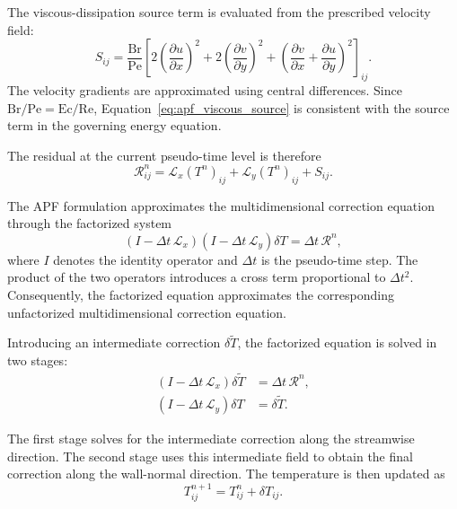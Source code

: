 The viscous-dissipation source term is evaluated from the
prescribed velocity field:
\begin{equation}
\boxed{
S_{ij}
=
\frac{\mathrm{Br}}{\mathrm{Pe}}
\left[
2\left(\frac{\partial u}{\partial x}\right)^2
+
2\left(\frac{\partial v}{\partial y}\right)^2
+
\left(
\frac{\partial v}{\partial x}
+
\frac{\partial u}{\partial y}
\right)^2
\right]_{ij}.
}
\label{eq:apf_viscous_source}
\end{equation}
The velocity gradients are approximated using central differences.
Since $\mathrm{Br}/\mathrm{Pe}=\mathrm{Ec}/\mathrm{Re}$,
Equation~\eqref{eq:apf_viscous_source} is consistent with the
source term in the governing energy equation.

The residual at the current pseudo-time level is therefore
\begin{equation}
\boxed{
\mathcal{R}_{ij}^{n}
=
\mathcal{L}_x(T^n)_{ij}
+
\mathcal{L}_y(T^n)_{ij}
+
S_{ij}.
}
\label{eq:apf_current_residual}
\end{equation}

The APF formulation approximates the multidimensional
correction equation through the factorized system
\begin{equation}
\boxed{
\left(I-\Delta t\,\mathcal{L}_x\right)
\left(I-\Delta t\,\mathcal{L}_y\right)
\delta T
=
\Delta t\,\mathcal{R}^{n},
}
\label{eq:apf_factorized_equation}
\end{equation}
where $I$ denotes the identity operator and $\Delta t$ is
the pseudo-time step. The product of the two operators
introduces a cross term proportional to $\Delta t^2$.
Consequently, the factorized equation approximates the
corresponding unfactorized multidimensional correction equation.

Introducing an intermediate correction
$\delta\widetilde{T}$, the factorized equation is solved in
two stages:
\begin{align}
\left(I-\Delta t\,\mathcal{L}_x\right)
\delta\widetilde{T}
&=
\Delta t\,\mathcal{R}^{n},
\label{eq:apf_x_stage}
\\[0.2cm]
\left(I-\Delta t\,\mathcal{L}_y\right)
\delta T
&=
\delta\widetilde{T}.
\label{eq:apf_y_stage}
\end{align}

The first stage solves for the intermediate correction along
the streamwise direction. The second stage uses this
intermediate field to obtain the final correction along the
wall-normal direction. The temperature is then updated as
\begin{equation}
\boxed{
T_{ij}^{n+1}
=
T_{ij}^{n}+\delta T_{ij}.
}
\label{eq:apf_temperature_update}
\end{equation}

